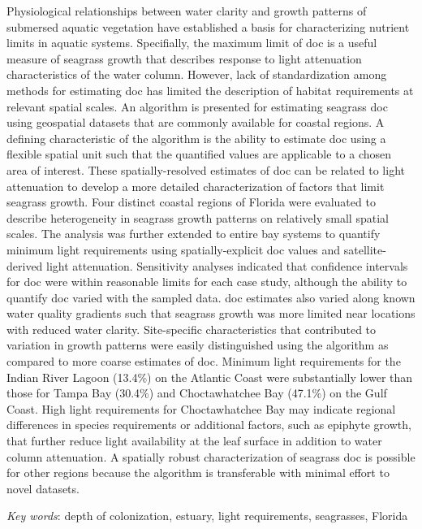 \documentclass[letterpaper,12pt,oneside]{article}\usepackage[]{graphicx}\usepackage[]{color}
\begin{document}
Physiological relationships between water clarity and growth patterns of submersed aquatic vegetation have established a basis for characterizing nutrient limits in aquatic systems.  Specifially, the maximum limit of \ac{doc} is a useful measure of seagrass growth that describes response to light attenuation characteristics of the water column.  However, lack of standardization among methods for estimating \ac{doc} has limited the description of habitat requirements at relevant spatial scales.  An algorithm is presented for estimating seagrass \ac{doc} using geospatial datasets that are commonly available for coastal regions.  A defining characteristic of the algorithm is the ability to estimate \ac{doc} using a flexible spatial unit such that the quantified values are applicable to a chosen area of interest.  These spatially-resolved estimates of \ac{doc} can be related to light attenuation to develop a more detailed characterization of factors that limit seagrass growth.  Four distinct coastal regions of Florida were evaluated to describe heterogeneity in seagrass growth patterns on relatively small spatial scales.  The analysis was further extended to entire bay systems to quantify minimum light requirements using spatially-explicit \ac{doc} values and satellite-derived light attenuation.  Sensitivity analyses indicated that confidence intervals for \ac{doc} were within reasonable limits for each case study, although the ability to quantify \ac{doc} varied with the sampled data.  \ac{doc} estimates also varied along known water quality gradients such that seagrass growth was more limited near locations with reduced water clarity. Site-specific characteristics that contributed to variation in growth patterns were easily distinguished using the algorithm as compared to more coarse estimates of \ac{doc}.  Minimum light requirements for the Indian River Lagoon (13.4\%) on the Atlantic Coast were substantially lower than those for Tampa Bay (30.4\%) and Choctawhatchee Bay (47.1\%) on the Gulf Coast.  High light requirements for Choctawhatchee Bay may indicate regional differences in species requirements or additional factors, such as epiphyte growth, that further reduce light availability at the leaf surface in addition to water column attenuation.  A spatially robust characterization of seagrass \ac{doc} is possible for other regions because the algorithm is transferable with minimal effort to novel datasets.

\noindent \textit{Key words}: depth of colonization, estuary, light requirements, seagrasses, Florida
\end{document}

